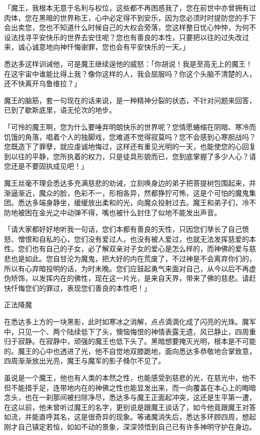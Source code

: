 \documentclass[12pt,twoside,openany]{book}
\begin{document}
「魔王，我根本无意于名利与权位，这些都不再困惑我了，您在前世中亦曾拥有过肉体，您在黑暗的世界称王，心中必定得不到安乐，因为您必须时时提防您的手下会出卖您，您也不知道什么时候自己的大权会旁落，您这样整日忧心忡忡，为何不设法找寻平安快乐的世界去安住呢？您也有善良的本性，只要把以往的过失改过来，诚心诚意地向神忏悔谢罪，您也会有平安快乐的一天。」

悉达多这样训诫他，可是魔王继续逞他的威怒：「你胡说！我是至高无上的魔王！在这宇宙中谁能比得上我？像你这样的人，我会屈服吗？你这个头脑不清楚的人，还不快离开乌鲁维拉？」

魔王的脑筋，套一句现在的话来说，是一种精神分裂的状态，不针对问题来回答，已到了歇斯底里，语无伦次的地步。

「可怜的魔王啊，您为什么要唾弃明朗快乐的世界呢？您情愿蜷缩在阴暗、寒冷而饥饿的角落，唱着个人的独脚戏，您难道不觉得寂莫吗？您不会感到心寒胆战吗？您既造下了罪孽，就应虔诚地悔过，这样还有重见光明的一天，也能使您的心回复到以往的平静，您所执着的权力，只是徒具形貌而已，您到底掌握了多少人心？请您还是不要固执成见吧！」

魔王丝毫不理会悉达多充满慈悲的劝诫，立刻唤身边的弟子把菩提树包围起来，并渐逼渐近，魔众的脸，色彩不一，形相各异，然都狰狞可怖，这是个可怕的魔鬼集团。悉达多端身静坐，缓缓放出柔和的光，向魔众投射过去。魔王和弟子们，冷不防地被困在金光之中动弹不得，嘴也被什么封住了似地不能发出声音。

「请大家都好好地听我一句话，您们本都有善良的天性，只因您们孳长了自己愤怒、憎恨和自私的心，您们没有爱过人，也没有被人爱过，也就无法发挥慈爱的本性。您们也有自己的子女，必了解双亲对子女的爱心是怎么样的，而神佛的爱与慈悲也是如此。您自甘沦为魔鬼，把大好的内在荒废了，不过神是不会离弃你们的，所以有心弃暗投明的话，为时未晚。您们应鼓起勇气来面对自己，从今以后不再虚伪矫饰，以发挥内在的佛性，现在这一片光，是来自天界，带来了佛的慈悲。请赶快忏悔您们的罪过，表现您们善良的本性吧！」

正法降魔

在悉达多上方的一块黑影，此时如寒冰之消解，点点滴滴化成了闪亮的光珠。魔军中，只见一个、两个陆续低下了头，懊恼悔恨的神情表露无遗，风已静止，四周重归于寂静。在寂静中，顽强的魔王也低下头了。黑暗想要掩灭光明，根本是不可能的。魔王的心中也透进了光，他不自觉地双膝跪地，面向悉达多恭敬地合掌致意，四周渐渐放出光亮，魔王与魔军的影子倏尔不见了。

虽说是一个魔王，他也有人类的本然之性，也能感受到慈悲的光，在慈光中，他不但不能措手足，连带地内在的神佛之性也能显发出来，而一向覆盖在本心上的晦暗念头，也在一刹那间被扫除净尽，悉达多与魔王正面起冲突，这还是生平第一遭，在这以前，他未曾听过魔王的名字，更别说是跟魔王谈话了，如今他竟跟魔王对答如流，并能直呼其名，这是很奇异的现象。等诸魔消失后，悉达多环顾四周，想起刚才自己镇定若恒，如如不动的景象，深深领悟到自己已有许多神明守护在身边。
\end{document}
